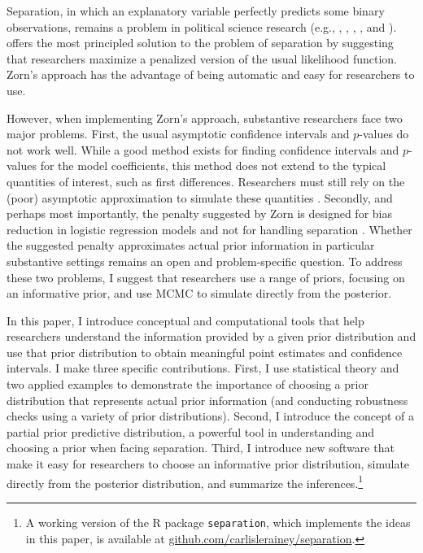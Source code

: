 \documentclass[12pt]{article}
\begin{document}
\newpage
\doublespace

Separation, in which an explanatory variable perfectly predicts some binary observations, remains a problem in political science research (e.g.,  \citealt{BarrilleauxRainey2014},  \citealt{BellMiller2014}, \citealt{LeemanMares2014}, \citealt{Reiter2014}, and \citealt{Weisiger2014}). \cite{Zorn2005} offers the most principled solution to the problem of separation by suggesting that researchers maximize a penalized version of the usual likelihood function. Zorn's approach has the advantage of being automatic and easy for researchers to use.

However, when implementing Zorn's approach, substantive researchers face two major problems. First, the usual asymptotic confidence intervals and $p$-values do not work well. While a good method exists for finding confidence intervals and $p$-values for the model coefficients, this method does not extend to the typical quantities of interest, such as first differences. Researchers must still rely on the (poor) asymptotic approximation to simulate these quantities \citep{KingTomzWittenberg2000}.  Secondly, and perhaps most importantly, the penalty suggested by Zorn is designed for bias reduction in logistic regression models and not for handling separation \citep{Firth1993}. Whether the suggested penalty approximates actual prior information in particular substantive settings remains an open and problem-specific question. To address these two problems, I suggest that researchers use a range of priors, focusing on an informative prior, and use MCMC to simulate directly from the posterior.

In this paper, I introduce conceptual and computational tools that help researchers understand the information provided by a given prior distribution and use that prior distribution to obtain meaningful point estimates and confidence intervals. I make three specific contributions. First, I use statistical theory and two applied examples to demonstrate the importance of choosing a prior distribution that represents actual prior information (and conducting robustness checks using a variety of prior distributions). Second, I introduce the concept of a partial prior predictive distribution, a powerful tool in understanding and choosing a prior when facing separation. Third, I introduce new software that make it easy for researchers to choose an informative prior distribution, simulate directly from the posterior distribution, and summarize the inferences.\footnote{A working version of the R package \texttt{separation}, which implements the ideas in this paper, is available at \href{https://github.com/carlislerainey/separation}{github.com/carlislerainey/separation}.}
\end{document}
